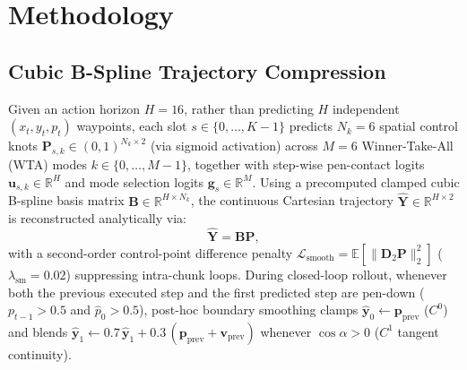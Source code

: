 \documentclass[10pt,twocolumn]{article}
\begin{document}
\section{Methodology}

\subsection{Cubic B-Spline Trajectory Compression}
Given an action horizon $H=16$, rather than predicting $H$ independent $(x_t, y_t, p_t)$ waypoints, each slot $s \in \{0, \dots, K-1\}$ predicts $N_k=6$ spatial control knots $\mathbf{P}_{s,k} \in (0,1)^{N_k \times 2}$ (via sigmoid activation) across $M=6$ Winner-Take-All (WTA) modes $k \in \{0, \dots, M-1\}$, together with step-wise pen-contact logits $\mathbf{u}_{s,k} \in \mathbb{R}^{H}$ and mode selection logits $\mathbf{g}_s \in \mathbb{R}^M$. Using a precomputed clamped cubic B-spline basis matrix $\mathbf{B} \in \mathbb{R}^{H \times N_k}$, the continuous Cartesian trajectory $\hat{\mathbf{Y}} \in \mathbb{R}^{H \times 2}$ is reconstructed analytically via:
\begin{equation}
    \hat{\mathbf{Y}} = \mathbf{B}\mathbf{P},
\end{equation}
with a second-order control-point difference penalty $\mathcal{L}_{\text{smooth}} = \mathbb{E}[\|\mathbf{D}_2 \mathbf{P}\|_2^2]$ ($\lambda_{\text{sm}}=0.02$) suppressing intra-chunk loops. During closed-loop rollout, whenever both the previous executed step and the first predicted step are pen-down ($p_{t-1} > 0.5$ and $\hat{p}_0 > 0.5$), post-hoc boundary smoothing clamps $\hat{\mathbf{y}}_0 \leftarrow \mathbf{p}_{\text{prev}}$ ($C^0$) and blends $\hat{\mathbf{y}}_1 \leftarrow 0.7\,\hat{\mathbf{y}}_1 + 0.3\,(\mathbf{p}_{\text{prev}} + \mathbf{v}_{\text{prev}})$ whenever $\cos\alpha > 0$ ($C^1$ tangent continuity).
\end{document}
